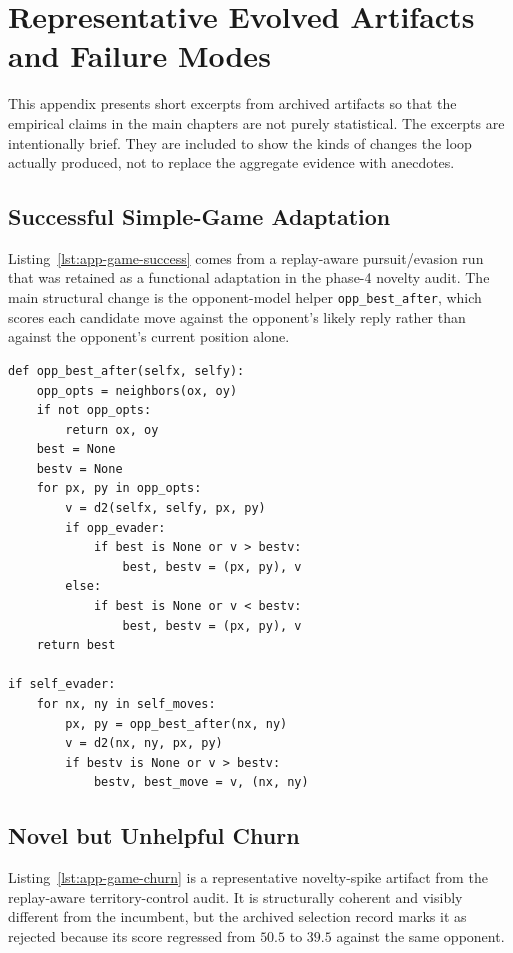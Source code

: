 \chapter{Representative Evolved Artifacts and Failure Modes}
\label{chap:artifact-appendix}

This appendix presents short excerpts from archived artifacts so that the empirical claims in the
main chapters are not purely statistical. The excerpts are intentionally brief. They are included to
show the kinds of changes the loop actually produced, not to replace the aggregate evidence with
anecdotes.

\section{Successful Simple-Game Adaptation}
\label{sec:appendix-game-success}

Listing~\ref{lst:app-game-success} comes from a replay-aware pursuit/evasion run that was retained
as a functional adaptation in the phase-4 novelty audit. The main structural change is the
opponent-model helper \texttt{opp\_best\_after}, which scores each candidate move against the
opponent's likely reply rather than against the opponent's current position alone.

\begin{lstlisting}[caption={Accepted pursuit/evasion policy excerpt from the replay-aware transfer suite.},label={lst:app-game-success}]
def opp_best_after(selfx, selfy):
    opp_opts = neighbors(ox, oy)
    if not opp_opts:
        return ox, oy
    best = None
    bestv = None
    for px, py in opp_opts:
        v = d2(selfx, selfy, px, py)
        if opp_evader:
            if best is None or v > bestv:
                best, bestv = (px, py), v
        else:
            if best is None or v < bestv:
                best, bestv = (px, py), v
    return best

if self_evader:
    for nx, ny in self_moves:
        px, py = opp_best_after(nx, ny)
        v = d2(nx, ny, px, py)
        if bestv is None or v > bestv:
            bestv, best_move = v, (nx, ny)
\end{lstlisting}

\section{Novel but Unhelpful Churn}
\label{sec:appendix-game-churn}

Listing~\ref{lst:app-game-churn} is a representative novelty-spike artifact from the replay-aware
territory-control audit. It is structurally coherent and visibly different from the incumbent, but
the archived selection record marks it as rejected because its score regressed from $50.5$ to
$39.5$ against the same opponent.

